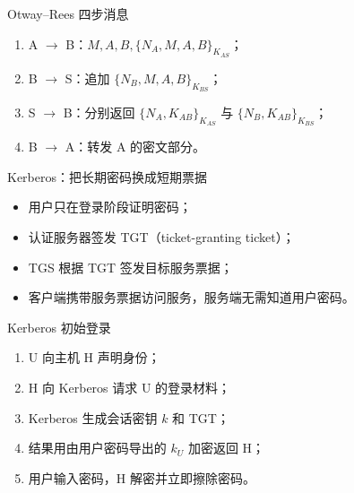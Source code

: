 \documentclass[UTF8,fontset=none,aspectratio=169,10pt]{beamer}
\begin{document}
\begin{frame}{Otway--Rees 四步消息}
\begin{enumerate}
  \item A $\rightarrow$ B：$M,A,B,\{N_A,M,A,B\}_{K_{AS}}$；
  \item B $\rightarrow$ S：追加 $\{N_B,M,A,B\}_{K_{BS}}$；
  \item S $\rightarrow$ B：分别返回 $\{N_A,K_{AB}\}_{K_{AS}}$ 与 $\{N_B,K_{AB}\}_{K_{BS}}$；
  \item B $\rightarrow$ A：转发 A 的密文部分。
\end{enumerate}
\vfill
{}
\end{frame}

\begin{frame}{Kerberos：把长期密码换成短期票据}
\begin{itemize}
  \item 用户只在登录阶段证明密码；
  \item 认证服务器签发 TGT（ticket-granting ticket）；
  \item TGS 根据 TGT 签发目标服务票据；
  \item 客户端携带服务票据访问服务，服务端无需知道用户密码。
\end{itemize}
\begin{center}
\end{center}
\end{frame}

\begin{frame}{Kerberos 初始登录}
\begin{enumerate}
  \item U 向主机 H 声明身份；
  \item H 向 Kerberos 请求 U 的登录材料；
  \item Kerberos 生成会话密钥 $k$ 和 TGT；
  \item 结果用由用户密码导出的 $k_U$ 加密返回 H；
  \item 用户输入密码，H 解密并立即擦除密码。
\end{enumerate}
\vfill
{}
\end{frame}
\end{document}

